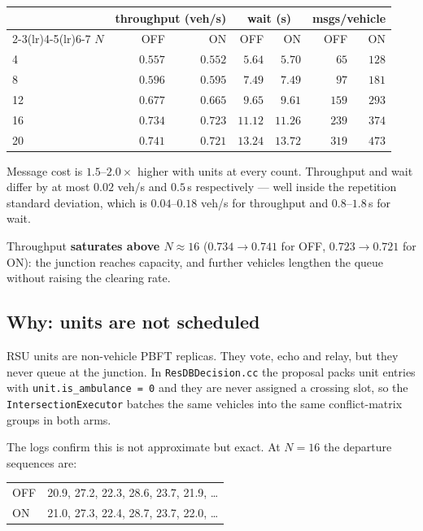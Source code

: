 \documentclass[11pt,a4paper]{article}
\newcommand{\code}[1]{\texttt{\small #1}}
\begin{document}
\begin{center}
\begin{tabular}{lrrrrrr}
\toprule
& \multicolumn{2}{c}{throughput (veh/s)} & \multicolumn{2}{c}{wait (s)}
& \multicolumn{2}{c}{msgs/vehicle} \\
\cmidrule(lr){2-3}\cmidrule(lr){4-5}\cmidrule(lr){6-7}
$N$ & OFF & ON & OFF & ON & OFF & ON \\
\midrule
4  & $0.557$ & $0.552$ & $5.64$  & $5.70$  & $65$  & $128$ \\
8  & $0.596$ & $0.595$ & $7.49$  & $7.49$  & $97$  & $181$ \\
12 & $0.677$ & $0.665$ & $9.65$  & $9.61$  & $159$ & $293$ \\
16 & $0.734$ & $0.723$ & $11.12$ & $11.26$ & $239$ & $374$ \\
20 & $0.741$ & $0.721$ & $13.24$ & $13.72$ & $319$ & $473$ \\
\bottomrule
\end{tabular}
\end{center}

\noindent
Message cost is $1.5$--$2.0\times$ higher with units at every count. Throughput
and wait differ by at most $0.02$ veh/s and $0.5$\,s respectively --- well
inside the repetition standard deviation, which is $0.04$--$0.18$ veh/s for
throughput and $0.8$--$1.8$\,s for wait.

Throughput \textbf{saturates above $N{\approx}16$} ($0.734 \to 0.741$ for OFF,
$0.723 \to 0.721$ for ON): the junction reaches capacity, and further vehicles
lengthen the queue without raising the clearing rate.

\subsection*{Why: units are not scheduled}

RSU units are non-vehicle PBFT replicas. They vote, echo and relay, but they
never queue at the junction. In \code{ResDBDecision.cc} the proposal packs unit
entries with \code{unit.is\_ambulance = 0} and they are never assigned a
crossing slot, so the \code{IntersectionExecutor} batches the same vehicles into
the same conflict-matrix groups in both arms.

The logs confirm this is not approximate but exact. At $N{=}16$ the departure
sequences are:

\begin{center}
\begin{tabular}{ll}
\toprule
OFF & 20.9, 27.2, 22.3, 28.6, 23.7, 21.9, \dots \\
ON  & 21.0, 27.3, 22.4, 28.7, 23.7, 22.0, \dots \\
\bottomrule
\end{tabular}
\end{center}
\end{document}
